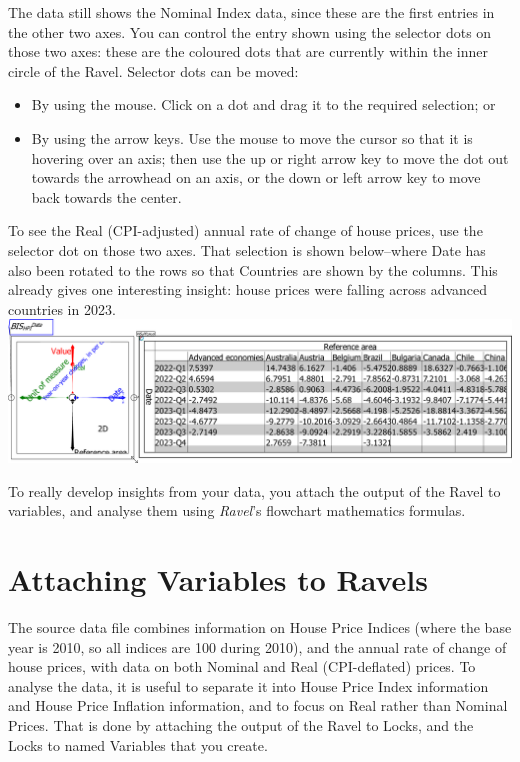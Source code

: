 The data still shows the Nominal Index data, since these are the first
entries in the other two axes. You can control the entry shown using
the selector dots on those two axes: these are the coloured dots that
are currently within the inner circle of the Ravel. Selector dots
can be moved:
\begin{itemize}
\item By using the mouse. Click on a dot and drag it to the required selection;
or 
\item By using the arrow keys. Use the mouse to move the cursor so that
it is hovering over an axis; then use the up or right arrow key to
move the dot out towards the arrowhead on an axis, or the down or
left arrow key to move back towards the center. 
\end{itemize}
To see the Real (CPI-adjusted) annual rate of change of house prices,
use the selector dot on those two axes. That selection is shown below--where
Date has also been rotated to the rows so that Countries are shown
by the columns. This already gives one interesting insight: house
prices were falling across advanced countries in 2023. \includegraphics[width=15cm]{images/tut04HPI4DwithSheetRotatedCountryDateRealChange}

To really develop insights from your data, you attach the output of
the Ravel to variables, and analyse them using \emph{Ravel}'s flowchart
mathematics formulas.

\section{Attaching Variables to Ravels}

The source data file combines information on House Price Indices (where
the base year is 2010, so all indices are 100 during 2010), and the
annual rate of change of house prices, with data on both Nominal and
Real (CPI-deflated) prices. To analyse the data, it is useful to separate
it into House Price Index information and House Price Inflation information,
and to focus on Real rather than Nominal Prices. That is done by attaching
the output of the Ravel to Locks, and the Locks to named Variables
that you create.

